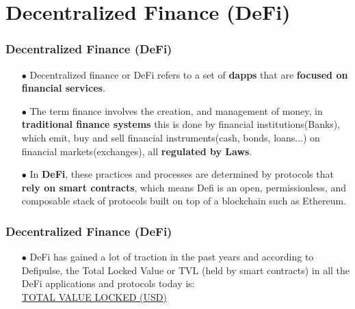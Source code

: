 \documentclass{beamer}
\begin{document}
\section{Decentralized Finance (DeFi)}

\begin{frame}	
\frametitle{Decentralized Finance (DeFi) }
	\begin{itemize}

		\item[$\bullet$] Decentralized finance or DeFi refers to a set of \textbf{dapps} that are \textbf{focused on financial services}. 
		\item[$\bullet$] The term finance involves the creation, and management of money, in \textbf{traditional finance systems} this is done by financial institutions(Banks), which emit, buy and sell financial instruments(cash, bonds, loans...) on financial markets(exchanges), all \textbf{regulated by Laws}. 
		\item[$\bullet$] In \textbf{DeFi}, these practices and processes are determined by protocols that \textbf{rely on smart contracts}, which means Defi is an open, permissionless, and composable stack of protocols built on top of a blockchain such as Ethereum.
	\end{itemize}
\end{frame}

\begin{frame}	
	\frametitle{Decentralized Finance (DeFi) }
	\begin{itemize}
		\item[$\bullet$]  DeFi has gained a lot of traction in the past years
		and according to Defipulse, the Total Locked Value or TVL (held by smart contracts) in all the DeFi applications and protocols today is: \\
		\href{https://www.defipulse.com/}{ TOTAL VALUE LOCKED (USD) }
	\end{itemize}
\end{frame}
\end{document}
